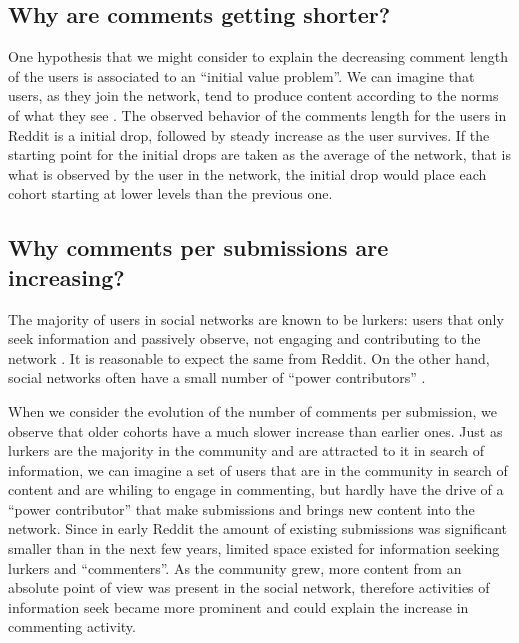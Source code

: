 \subsection{Why are comments getting shorter?}

One hypothesis that we might consider to explain the decreasing comment length of the users is associated to an ``initial value problem''. We can imagine that users, as they join the network, tend to produce content according to the norms of what they see \cite{Kooti2010, Danescu-niculescu-mizil2013}. The observed behavior of the comments length for the users in Reddit is a initial drop, followed by steady increase as the user survives. If the starting point for the initial drops are taken as the average of the network, that is what is observed by the user in the network, the initial drop would place each cohort starting at lower levels than the previous one.

\subsection{Why comments per submissions are increasing?}

The majority of users in social networks are known to be lurkers: users that only seek information and passively observe, not engaging and contributing to the network \cite{Rafaeli2004, Nonnecke2000}. It is reasonable to expect the same from Reddit. On the other hand, social networks often have a small number of ``power contributors'' \cite{Panciera2009, Kittur2007}.

When we consider the evolution of the number of comments per submission, we observe that older cohorts have a much slower increase than earlier ones. Just as lurkers are the majority in the community and are attracted to it in search of information, we can imagine a set of users that are in the community in search of content and are whiling to engage in commenting, but hardly have the drive of a ``power contributor'' that make submissions and brings new content into the network. Since in early Reddit the amount of existing submissions was significant smaller than in the next few years, limited space existed for information seeking lurkers and ``commenters''. As the community grew, more content from an absolute point of view was present in the social network, therefore activities of information seek became more prominent and could explain the increase in commenting activity. 

